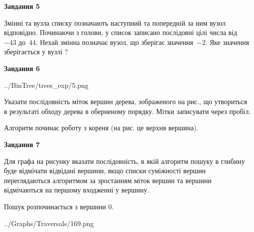 \documentclass[12pt, ukrainian]{article}
\begin{document}
{\begin {large}
{\begin {center}\textbf{Завдання 5}\end {center}}\par
Змінні  та  вузла списку позначають наступний та попередній за ним вузол відповідно. Починаючи з голови, у список записано послідовні цілі числа від~$-43$ до~$44$. Нехай змінна  позначає вузол, що зберігає значення~$-2$.
Яке значення зберігається у вузлі  ?\par
\newpage

{\begin {center}\textbf{Завдання 6}\end {center}}\par

\begin{center}
	{../BinTree/trees_exp/5.png}
\end{center}
Указати послідовність міток вершин дерева, зображеного на рис., що утвориться в результаті обходу дерева в оберненому порядку. Мітки записувати через пробіл.\par Алгоритм починає роботу з кореня (на рис. це верхня вершина).\par
\newpage

{\begin {center}\textbf{Завдання 7}\end {center}}\par
Для графа на рисунку вказати послідовність, в якій алгоритм пошуку в глибину буде відмічати відвідані вершини, якщо списки суміжності вершин переглядаються алгоритмом за зростанням міток вершин та вершини відмічаються на першому вход\-женні у вершину.\par
Пошук розпочинається з вершини 0.\par

\begin{center}
	{../Graphs/Traversals/169.png}
\end{center}\par
\newpage


\end{large}}
\end{document}
